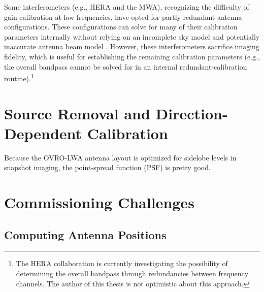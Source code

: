\begin{bibunit}
Some interferometers (e.g., HERA and the MWA), recognizing the difficulty of gain calibration at low
frequencies, have opted for partly redundant antenna configurations. These configurations can solve
for many of their calibration parameters internally without relying on an incomplete sky model and
potentially inaccurate antenna beam model \citep{2010MNRAS.408.1029L}. However, these
interferometers sacrifice imaging fidelity, which is useful for establishing the remaining
calibration parameters (e.g., the overall bandpass cannot be solved for in an internal
redundant-calibration routine).\footnote{
    The HERA collaboration is currently investigating the possibility of determining the overall
    bandpass through redundancies between frequency channels. The author of this thesis is not
    optimistic about this approach.
}

\section{Source Removal and Direction-Dependent Calibration}

Because the OVRO-LWA antenna layout is optimized for sidelobe levels in snapshot imaging, the
point-spread function (PSF) is pretty good.

\section{Commissioning Challenges}
\label{sec:commissioning-challenges}

\subsection{Computing Antenna Positions}


\end{bibunit}
